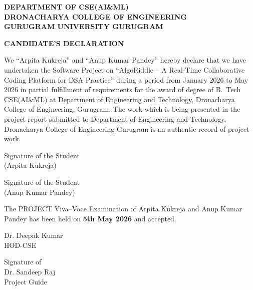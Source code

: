 \clearpage
{}
\begin{center}
\textbf{DEPARTMENT OF CSE(AI\&ML)}\\[0.2cm]
\textbf{DRONACHARYA COLLEGE OF ENGINEERING}\\[0.2cm]
\textbf{GURUGRAM UNIVERSITY GURUGRAM}

\vspace{1.5cm}

\textbf{\Large CANDIDATE'S DECLARATION}
\end{center}

\vspace{0.5cm}

We ``Arpita Kukreja'' and ``Anup Kumar Pandey'' hereby declare that we have undertaken the Software Project on ``AlgoRiddle -- A Real-Time Collaborative Coding Platform for DSA Practice'' during a period from January 2026 to May 2026 in partial fulfillment of requirements for the award of degree of B.~Tech CSE(AI\&ML) at Department of Engineering and Technology, Dronacharya College of Engineering, Gurugram. The work which is being presented in the project report submitted to Department of Engineering and Technology, Dronacharya College of Engineering Gurugram is an authentic record of project work.

\vspace{3cm}

\begin{minipage}[t]{0.45\textwidth}
\raggedright
Signature of the Student\\
(Arpita Kukreja)
\end{minipage}
\hfill
\begin{minipage}[t]{0.45\textwidth}
\raggedleft
Signature of the Student\\
(Anup Kumar Pandey)
\end{minipage}

\vspace{2cm}

The PROJECT Viva--Voce Examination of Arpita Kukreja and Anup Kumar Pandey has been held on \textbf{5th May 2026} and accepted.

\vspace{2cm}

\noindent
\begin{minipage}[t]{0.45\textwidth}
Dr. Deepak Kumar\\
HOD-CSE
\end{minipage}
\hfill
\begin{minipage}[t]{0.45\textwidth}
\raggedleft
Signature of\\
Dr. Sandeep Raj\\
Project Guide
\end{minipage}

\clearpage
